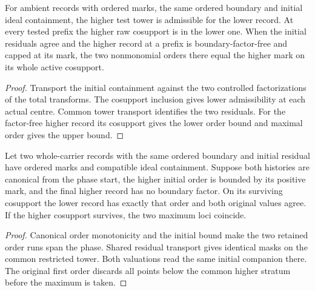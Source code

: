 \begin{theorem}
\label{hir:g8-shared-residual-active-order}
\leanok
For ambient records with ordered marks, the same ordered
boundary and initial ideal containment, the higher test
tower is admissible for the lower record. At every tested
prefix the higher raw cosupport is in the lower one. When
the initial residuals agree and the higher record at a
prefix is boundary-factor-free and capped at its mark, the
two nonmonomial orders there equal the higher mark on its
whole active cosupport.
\end{theorem}
\begin{proof}
Transport the initial containment against the two controlled
factorizations of the total transforms. The cosupport inclusion
gives lower admissibility at each actual centre. Common tower
transport identifies the two residuals. For the factor-free
higher record its cosupport gives the lower order bound and
maximal order gives the upper bound.
\end{proof}

\begin{theorem}
\label{hir:g8-shared-residual-retained-phase}
\leanok
Let two whole-carrier records with the same ordered boundary and
initial residual have ordered marks and compatible ideal containment.
Suppose both histories are canonical from the phase start, the higher
initial order is bounded by its positive mark, and the final higher
record has no boundary factor. On its surviving cosupport the lower
record has exactly that order and both original values agree. If the
higher cosupport survives, the two maximum loci coincide.
\end{theorem}
\begin{proof}
Canonical order monotonicity and the initial bound make the two
retained order runs span the phase. Shared residual transport gives
identical masks on the common restricted tower. Both valuations read
the same initial companion there. The original first order discards
all points below the common higher stratum before the maximum is taken.
\end{proof}

